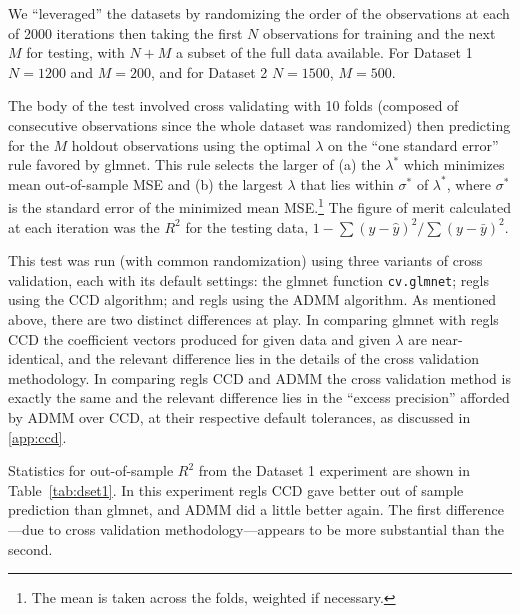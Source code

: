 \documentclass{article}
\begin{document}
We ``leveraged'' the datasets by randomizing the order of the
observations at each of 2000 iterations then taking the first $N$
observations for training and the next $M$ for testing, with $N+M$
a subset of the full data available. For Dataset 1 $N=1200$ and
$M=200$, and for Dataset 2 $N=1500$, $M=500$.

The body of the test involved cross validating with 10 folds (composed
of consecutive observations since the whole dataset was randomized)
then predicting for the $M$ holdout observations using the optimal
$\lambda$ on the ``one standard error'' rule favored by
\textsf{glmnet}. This rule selects the larger of (a) the $\lambda^*$
which minimizes mean out-of-sample MSE and (b) the largest $\lambda$
that lies within $\sigma^*$ of $\lambda^*$, where $\sigma^*$ is the
standard error of the minimized mean MSE.\footnote{The mean is taken
  across the folds, weighted if necessary.} The figure of merit
calculated at each iteration was the $R^2$ for the testing data,
$1 - \sum (y-\hat{y})^2 / \sum (y-\bar{y})^2$.

This test was run (with common randomization) using three variants of
cross validation, each with its default settings: the \textsf{glmnet}
function \texttt{cv.glmnet}; \textrm{regls} using the CCD algorithm;
and \textsf{regls} using the ADMM algorithm. As mentioned above, there
are two distinct differences at play. In comparing \textsf{glmnet}
with \textsf{regls} CCD the coefficient vectors produced for given
data and given $\lambda$ are near-identical, and the relevant
difference lies in the details of the cross validation methodology. In
comparing \textsf{regls} CCD and ADMM the cross validation method is
exactly the same and the relevant difference lies in the ``excess
precision'' afforded by ADMM over CCD, at their respective default
tolerances, as discussed in \ref{app:ccd}.


Statistics for out-of-sample $R^2$ from the Dataset 1 experiment are
shown in Table~\ref{tab:dset1}. In this experiment \textsf{regls} CCD
gave better out of sample prediction than \textsf{glmnet}, and ADMM
did a little better again. The first difference---due to cross
validation methodology---appears to be more substantial than the
second.
\end{document}
